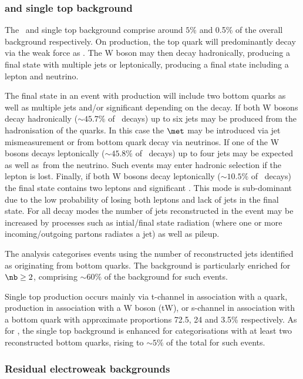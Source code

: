 \subsubsection{\ttj and single top background}

The \ttj~and single top background comprise around $5\%$ and 0.5\% of the overall
background respectively. On production, the top quark will predominantly decay via the 
weak force as \twb. The W boson may then decay hadronically, producing a final state
with multiple jets or leptonically, producing a final state including a lepton and neutrino. 

The final state in an event with \ttj production will include two bottom quarks as well as multiple 
jets and/or significant \met depending on the decay. If both W bosons decay hadronically ($\sim45.7\%$ of \ttbar~decays)
up to six jets may be produced from the hadronisation of the quarks. In this case the $\met$
may be introduced via jet mismeasurement or from bottom quark decay via neutrinos. If one of the 
W bosons decays leptonically ($\sim45.8\%$ of \ttbar~decays) up to four jets may be expected
as well as~\met from the neutrino. Such events may enter hadronic selection if the lepton is lost.
Finally, if both W bosons decay leptonically ($\sim10.5\%$ of \ttbar~decays) the final state contains two 
leptons and significant \met. This mode is sub-dominant due to the low probability of losing both leptons
and lack of jets in the final state. For all decay modes the number of jets reconstructed in the event
may be increased by processes such as intial/final state radiation (where one or more incoming/outgoing partons
radiates a jet) as well as pileup.

The \alphat analysis categorises events using the number of reconstructed 
jets identified as originating from bottom quarks. The \ttbar background is particularly
enriched for $\nb \ge 2$, comprising $\sim60\%$ of the background for such events.

Single top production occurs mainly via t-channel in association with a quark, production in 
association with a W boson (tW), or s-channel in association with a bottom quark with approximate
proportions 72.5, 24 and 3.5\% respectively. As for \ttj, the single top background is enhanced for 
categorisations with at least two reconstructed bottom quarks, rising to $\sim5\%$ of the total for
such events.

\subsubsection{Residual electroweak backgrounds}


